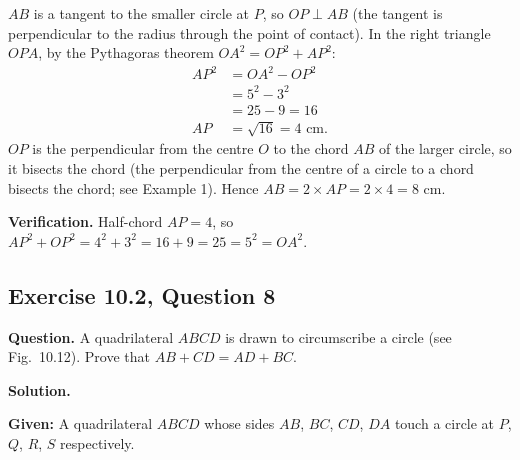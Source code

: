 $AB$ is a tangent to the smaller circle at $P$, so $OP\perp AB$ (the tangent is perpendicular to the radius through the point of contact). In the right triangle $OPA$, by the Pythagoras theorem $OA^2=OP^2+AP^2$:
\begin{align*}
AP^2&=OA^2-OP^2\\
&=5^2-3^2\\
&=25-9=16\\
AP&=\sqrt{16}=4\text{ cm}.
\end{align*}
$OP$ is the perpendicular from the centre $O$ to the chord $AB$ of the larger circle, so it bisects the chord (the perpendicular from the centre of a circle to a chord bisects the chord; see Example 1). Hence $AB=2\times AP=2\times4=8$ cm.

\textbf{Verification.} Half-chord $AP=4$, so $AP^2+OP^2=4^2+3^2=16+9=25=5^2=OA^2$.


\subsection*{Exercise 10.2, Question 8}
\textbf{Question.} A quadrilateral $ABCD$ is drawn to circumscribe a circle (see Fig.\ 10.12). Prove that $AB+CD=AD+BC$.

\begin{center}
%
\end{center}

\textbf{Solution.}

\textbf{Given:} A quadrilateral $ABCD$ whose sides $AB$, $BC$, $CD$, $DA$ touch a circle at $P$, $Q$, $R$, $S$ respectively.


